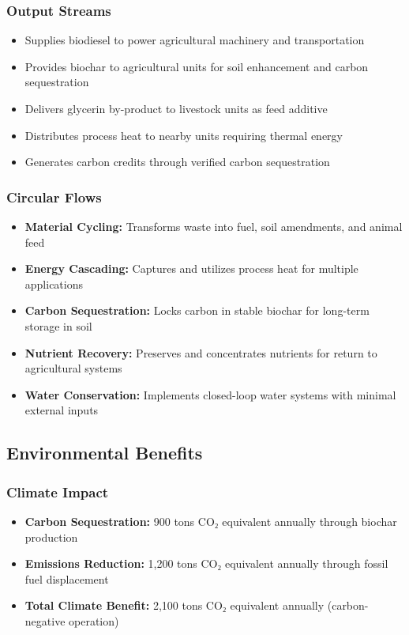 \subsubsection{Output Streams}
\begin{itemize}
    \item Supplies biodiesel to power agricultural machinery and transportation
    \item Provides biochar to agricultural units for soil enhancement and carbon sequestration
    \item Delivers glycerin by-product to livestock units as feed additive
    \item Distributes process heat to nearby units requiring thermal energy
    \item Generates carbon credits through verified carbon sequestration
\end{itemize}

\subsubsection{Circular Flows}
\begin{itemize}
    \item \textbf{Material Cycling:} Transforms waste into fuel, soil amendments, and animal feed
    \item \textbf{Energy Cascading:} Captures and utilizes process heat for multiple applications
    \item \textbf{Carbon Sequestration:} Locks carbon in stable biochar for long-term storage in soil
    \item \textbf{Nutrient Recovery:} Preserves and concentrates nutrients for return to agricultural systems
    \item \textbf{Water Conservation:} Implements closed-loop water systems with minimal external inputs
\end{itemize}

\subsection{Environmental Benefits}

\subsubsection{Climate Impact}
\begin{itemize}
    \item \textbf{Carbon Sequestration:} 900 tons CO₂ equivalent annually through biochar production
    \item \textbf{Emissions Reduction:} 1,200 tons CO₂ equivalent annually through fossil fuel displacement
    \item \textbf{Total Climate Benefit:} 2,100 tons CO₂ equivalent annually (carbon-negative operation)
\end{itemize}

